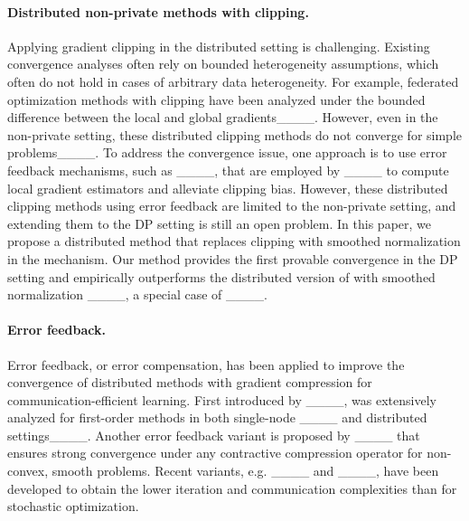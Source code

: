 \paragraph{Distributed non-private methods with clipping.}
Applying gradient clipping in the distributed setting is challenging.
Existing convergence analyses often rely on bounded heterogeneity assumptions, which often do not hold in cases of arbitrary data heterogeneity.
For example, federated optimization methods with clipping have been analyzed under the bounded difference between the local and global gradients____.
However, even in the non-private setting, these distributed clipping methods do not converge for simple problems____. 
To address the convergence issue, one approach is to use error feedback mechanisms, such as  ____, that are employed by ____ to compute local gradient estimators and alleviate clipping bias. However, these distributed clipping methods using error feedback are limited to the non-private setting, and extending them to the DP setting is still an open problem.
In this paper, we propose a distributed method that replaces clipping with smoothed normalization in the  mechanism. 
Our method provides the first provable convergence in the DP setting and empirically outperforms the distributed version of  with smoothed normalization ____, a special case of ____.


\paragraph{Error feedback.} 
Error feedback, or error compensation, has been applied to improve the convergence of distributed methods with gradient compression for communication-efficient learning.
First introduced by ____,  was extensively analyzed for first-order methods  in both single-node ____ and distributed settings____. 
Another error feedback variant is   proposed by ____ that ensures strong convergence under any contractive compression operator for non-convex, smooth problems.  
Recent variants, e.g. ____  and ____,  have been developed to obtain the lower iteration and communication complexities than  for stochastic optimization.